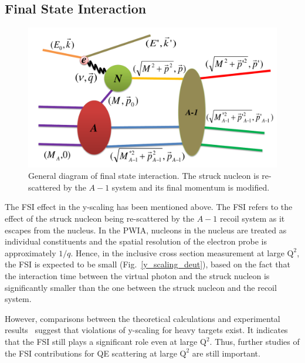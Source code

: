 \subsection{Final State Interaction}
\begin{figure}[!ht]
  \begin{center}
    \includegraphics[type=pdf,ext=.pdf,read=.pdf,width=0.80\linewidth]{./figures/physics/FSI}
    \caption[Final state interaction]{\footnotesize{General diagram of final state interaction. The struck nucleon is re-scattered by the $A-1$ system and its final momentum is modified.}}
    \label{fsi}
  \end{center}
\end{figure}
 The FSI effect in the y-scaling has been mentioned above. The FSI refers to the effect of the struck nucleon being re-scattered by the $A-1$ recoil system as it escapes from the nucleus. In the PWIA, nucleons in the nucleus are treated as individual constituents and the spatial resolution of the electron probe is approximately $1/q$. Hence, in the inclusive cross section measurement at large $\mathrm{Q^{2}}$, the FSI is expected to be small (Fig.~\ref{y_scaling_deut}), based on the fact that the interaction time between the virtual photon and the struck nucleon is significantly smaller than the one between the struck nucleon and the recoil system.

However, comparisons between the theoretical calculations and experimental results~\cite{PhysRevC.46.1045,PhysRevC.87.024606} suggest that violations of y-scaling for heavy targets exist. It indicates that the FSI still plays a significant role even at large $\mathrm{Q^{2}}$. Thus, further studies of the FSI contributions for QE scattering at large $\mathrm{Q^{2}}$ are still important.
